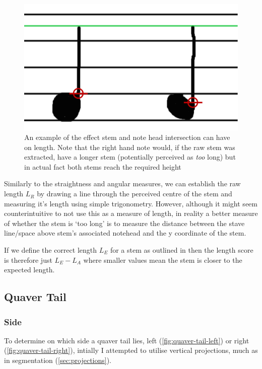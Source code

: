 \begin{figure}[h!]
    \centering
    \includegraphics[width=.8\textwidth]{gfx/techniques/stem-intersection-labelled.png}
    \caption{An example of the effect stem and note head intersection can have on length. Note that the right hand note would, if the raw stem was extracted, have a longer stem (potentially perceived as \emph{too} long) but in actual fact both stems reach the required height}
    \label{fig:stem-intersection}
\end{figure}

Similarly to the straightness and angular measures, we can establish the raw length $L_R$ by drawing a line through the perceived centre of the stem and measuring it's length using simple trigonometry. However, although it might seem counterintuitive to not use this as a measure of length, in reality a better measure of whether the stem is `too long' is to measure the distance between the stave line/space above stem's associated notehead and the y coordinate of the stem.

If we define the correct length $L_E$ for a stem as outlined in  then the length score is therefore just $L_E - L_A$ where smaller values mean the stem is closer to the expected length.

\subsection{Quaver Tail}

\subsubsection{Side}


To determine on which side a quaver tail lies, left (\cref{fig:quaver-tail-left}) or right (\cref{fig:quaver-tail-right}), intially I attempted to utilise vertical projections, much as in segmentation (\cref{sec:projections}).

